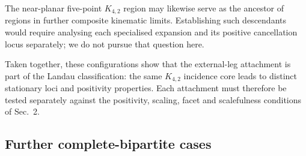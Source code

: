 \documentclass[a4paper,11pt]{article}
\begin{document}
The near-planar five-point \(K_{4,2}\) region may likewise serve as the
ancestor of regions in further composite kinematic limits.  Establishing
such descendants would require analysing each specialised expansion and its
positive cancellation locus separately; we do not pursue that question here.

Taken together, these configurations show that the external-leg attachment
is part of the Landau classification: the same \(K_{4,2}\) incidence core
leads to distinct stationary loci and positivity properties.  Each attachment
must therefore be tested separately against the positivity, scaling, facet
and scalefulness conditions of Sec.~2.

\subsection{Further complete-bipartite cases}
\end{document}
